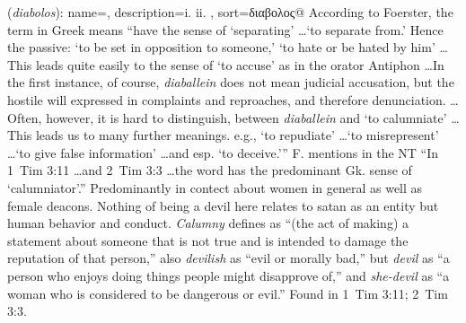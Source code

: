 \item[She-devil,]

(\textit{diabolos}):
{
    name=,
    description={i.  ii. },
    sort=διαβολος@
}
According to Foerster, the term in Greek means ``have the sense of `separating' \ldots `to separate from.' Hence the passive: `to be set in opposition to someone,' `to hate or be hated by him' \ldots This leads quite easily to the sense of `to accuse' as in the orator Antiphon \ldots In the first instance, of course, \emph{diaballein} does not mean judicial accusation, but the hostile will expressed in complaints and reproaches, and therefore denunciation. \ldots Often, however, it is hard to distinguish, between \emph{diaballein} and `to calumniate' \ldots This leads us to many further meanings. e.g., `to repudiate' \ldots `to misrepresent' \ldots `to give false information' \ldots and esp. `to deceive.'''  
F. mentions in the NT ``In 1~Tim 3:11 \ldots and 2~Tim 3:3 \ldots the word has the predominant Gk. sense of `calumniator'.''  
Predominantly in contect about women in general as well as female deacons. Nothing of being a devil here relates to satan as an entity but human behavior and conduct. \emph{Calumny} defines as ``(the act of making) a statement about someone that is not true and is intended to damage the reputation of that person,'' also \emph{devilish} as ``evil or morally bad,'' but \emph{devil} as ``a person who enjoys doing things people might disapprove of,'' and \emph{she-devil} as ``a woman who is considered to be dangerous or evil.''
Found in 1~Tim 3:11; 2~Tim 3:3.
